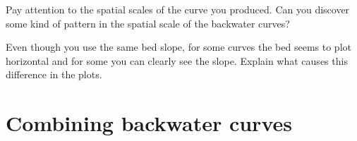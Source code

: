 \documentclass[a4paper]{article}
\begin{document}
\begin{exercise}
  Pay attention to the spatial scales of the curve you produced. Can you discover some kind of pattern in the spatial scale of the backwater curves?
\end{exercise}

\begin{exercise}
  Even though you use the same bed slope, for some curves the bed seems to plot horizontal and for some you can clearly see the slope. Explain what causes this difference in the plots.
\end{exercise}

\section{Combining backwater curves}
\end{document}
